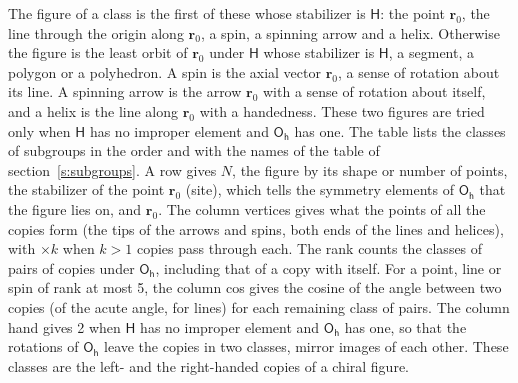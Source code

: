 \documentclass[10pt,a4paper]{article}
\numberwithin{equation}{section}
\newcommand{\grp}[1]{\mathsf{#1}}
\newcommand{\pointr}{\mathbf{r}}
\begin{document}
\leavevmode\label{n:head.figure}The figure of a class is the first of these whose stabilizer is $\grp{H}$: the point $\pointr_0$, the line through the origin along $\pointr_0$, a spin, a spinning arrow and a helix. Otherwise the figure is the least orbit of $\pointr_0$ under $\grp{H}$ whose stabilizer is $\grp{H}$, a segment, a polygon or a polyhedron. A spin is the axial vector $\pointr_0$, a sense of rotation about its line. A spinning arrow is the arrow $\pointr_0$ with a sense of rotation about itself, and a helix is the line along $\pointr_0$ with a handedness. These two figures are tried only when $\grp{H}$ has no improper element and $\grp{O_{h}}$ has one. The table lists the classes of subgroups in the order and with the names of the table of section~\ref{s:subgroups}. \label{n:head.site}A row gives $N$, the figure by its shape or number of points, the stabilizer of the point $\pointr_0$ (site), which tells the symmetry elements of $\grp{O_{h}}$ that the figure lies on, and $\pointr_0$. \label{n:head.vertices}The column vertices gives what the points of all the copies form (the tips of the arrows and spins, both ends of the lines and helices), with ${\times}k$ when $k > 1$ copies pass through each. \label{n:head.rank}The rank counts the classes of pairs of copies under $\grp{O_{h}}$, including that of a copy with itself. \label{n:head.cos}For a point, line or spin of rank at most 5, the column cos gives the cosine of the angle between two copies (of the acute angle, for lines) for each remaining class of pairs. \label{n:head.hand}The column hand gives 2 when $\grp{H}$ has no improper element and $\grp{O_{h}}$ has one, so that the rotations of $\grp{O_{h}}$ leave the copies in two classes, mirror images of each other. These classes are the left- and the right-handed copies of a chiral figure.
\end{document}
